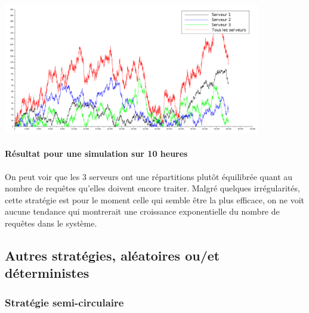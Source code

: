 \documentclass{article}
\begin{document}
\begin{center}
	\includegraphics[width=425px]{img/aleatls.png}
\end{center}
\paragraph{Résultat pour une simulation sur 10 heures}
On peut voir que les 3 serveurs ont une répartitions plutôt équilibrée quant au nombre de requêtes qu'elles doivent encore traiter. Malgré quelques irrégularités, cette stratégie est pour le moment celle qui semble être la plus efficace, on ne voit aucune tendance qui montrerait une croissance exponentielle du nombre de requêtes dans le système.  

\subsection{Autres stratégies, aléatoires ou/et déterministes}

\subsubsection{Stratégie semi-circulaire}
\end{document}
